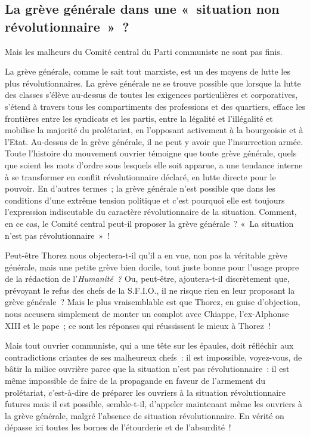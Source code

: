 \documentclass[french,twoside]{book} %
\begin{document}
\subsection[{La grève générale dans une « situation non révolutionnaire » ?}]{La grève générale dans une « situation non révolutionnaire » ?}
Mais les malheurs du Comité central du Parti communiste ne sont pas finis.\par
La grève générale, comme le sait tout marxiste, est un des moyens de lutte les plus révolutionnaires. La grève générale ne se trouve possible que lorsque la lutte des classes s’élève au-dessus de toutes les exigences particulières et corporatives, s’étend à travers tous les compartiments des professions et des quartiers, efface les frontières entre les syndicats et les partis, entre la légalité et l’illégalité et mobilise la majorité du prolétariat, en l’opposant activement à la bourgeoisie et à l’Etat. Au-dessus de la grève générale, il ne peut y avoir que l’insurrection armée. Toute l’histoire du mouvement ouvrier témoigne que toute grève générale, quels que soient les mots d’ordre sous lesquels elle soit apparue, a une tendance interne à se transformer en conflit révolutionnaire déclaré, en lutte directe pour le pouvoir. En d’autres termes ; la grève générale n’est possible que dans les conditions d’une extrême tension politique et c’est pourquoi elle est toujours l’expression indiscutable du caractère révolutionnaire de la situation. Comment, en ce cas, le Comité central peut-il proposer la grève générale ? « La situation n’est pas révolutionnaire » !\par
Peut-être Thorez nous objectera-t-il qu’il a en vue, non pas la véritable grève générale, mais une petite grève bien docile, tout juste bonne pour l’usage propre de la rédaction  de l’\emph{Humanité ?} Ou, peut-être, ajoutera-t-il discrètement que, prévoyant le refus des chefs de la S.F.I.O., il ne risque rien en leur proposant la grève générale ? Mais le plus vraisemblable est que Thorez, en guise d’objection, nous accusera simplement de monter un complot avec Chiappe, l’ex-Alphonse XIII et le pape ; ce sont les réponses qui réussissent le mieux à Thorez !\par
Mais tout ouvrier communiste, qui a une tête sur les épaules, doit réfléchir aux contradictions criantes de ses malheureux chefs : il est impossible, voyez-vous, de bâtir la milice ouvrière parce que la situation n’est pas révolutionnaire : il est même impossible de faire de la propagande en faveur de l’armement du prolétariat, c’est-à-dire de préparer les ouvriers à la situation révolutionnaire futures mais il est possible, semble-t-il, d’appeler maintenant même les ouvriers à la grève générale, malgré l’absence de situation révolutionnaire. En vérité on dépasse ici toutes les bornes de l’étourderie et de l’absurdité !
\end{document}
